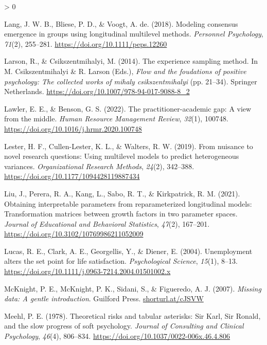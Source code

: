 \documentclass[
12pt, %
twoside,
english]{guelphthesis}
\newlength{\cslhangindent}
\newenvironment{CSLReferences}[2] %
 {%
  \setlength{\parindent}{0pt}
  \ifodd #1 \everypar{\setlength{\hangindent}{\cslhangindent}}\ignorespaces\fi
  \ifnum #2 > 0
  \setlength{\parskip}{\linespacing{2}}
  \fi
 }%
 {}
\begin{document}
\begin{CSLReferences}{1}{0}
\leavevmode{}%
Lang, J. W. B., Bliese, P. D., \& Voogt, A. de. (2018). Modeling consensus emergence in groups using longitudinal multilevel methods. \emph{Personnel Psychology}, \emph{71}(2), 255--281. \url{https://doi.org/10.1111/peps.12260}

\leavevmode{}%
Larson, R., \& Csikszentmihalyi, M. (2014). The experience sampling method. In M. Csikszentmihalyi \& R. Larson (Eds.), \emph{Flow and the foudations of positive psychology: The collected works of mihaly csikszentmihalyi} (pp. 21--34). Springer Netherlands. \url{https://doi.org/10.1007/978-94-017-9088-8_2}

\leavevmode{}%
Lawler, E. E., \& Benson, G. S. (2022). The practitioner-academic gap: A view from the middle. \emph{Human Resource Management Review}, \emph{32}(1), 100748. \url{https://doi.org/10.1016/j.hrmr.2020.100748}

\leavevmode{}%
Lester, H. F., Cullen-Lester, K. L., \& Walters, R. W. (2019). From nuisance to novel research questions: Using multilevel models to predict heterogeneous variances. \emph{Organizational Research Methods}, \emph{24}(2), 342--388. \url{https://doi.org/10.1177/1094428119887434}

\leavevmode{}%
Liu, J., Perera, R. A., Kang, L., Sabo, R. T., \& Kirkpatrick, R. M. (2021). Obtaining interpretable parameters from reparameterized longitudinal models: Transformation matrices between growth factors in two parameter spaces. \emph{Journal of Educational and Behavioral Statistics}, \emph{47}(2), 167--201. \url{https://doi.org/10.3102/10769986211052009}

\leavevmode{}%
Lucas, R. E., Clark, A. E., Georgellis, Y., \& Diener, E. (2004). Unemployment alters the set point for life satisfaction. \emph{Psychological Science}, \emph{15}(1), 8--13. \url{https://doi.org/10.1111/j.0963-7214.2004.01501002.x}

\leavevmode{}%
McKnight, P. E., McKnight, P. K., Sidani, S., \& Figueredo, A. J. (2007). \emph{Missing data: A gentle introduction}. Guilford Press. \href{https://shorturl.at/cJSVW}{shorturl.at/cJSVW}

\leavevmode{}%
Meehl, P. E. (1978). Theoretical risks and tabular asterisks: Sir Karl, Sir Ronald, and the slow progress of soft psychology. \emph{Journal of Consulting and Clinical Psychology}, \emph{46}(4), 806--834. \url{https://doi.org/10.1037/0022-006x.46.4.806}


\end{CSLReferences}
\end{document}
